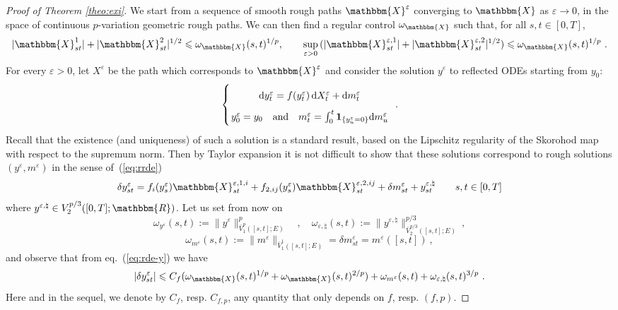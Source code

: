\documentclass[11pt,reqno,oneside]{amsart}
\numberwithin{equation}{section}
\newcommand{\mathd}{\mathrm{d}}
\newcommand{\ep}{\varepsilon}
\begin{document}
\begin{proof}[Proof of Theorem \ref{theo:exi}]
We start from a sequence of smooth rough paths $\mathbbm{X}^{\varepsilon}$
converging to $\mathbbm{X}$ as $\varepsilon \to 0$, in the space of continuous $p$-variation geometric rough
paths. We can then find a regular control $\omega_{\mathbbm{X}}$ such that, for all $s,t\in [0,T]$,
\[ | \mathbbm{X}^1_{s t} | + | \mathbbm{X}^2_{s t} |^{1 / 2} \leqslant
   \omega_{\mathbbm{X}} (s, t)^{1 / p}, \qquad \sup_{\varepsilon >0}\, (|
   \mathbbm{X}^{\varepsilon, 1}_{s t} | + | \mathbbm{X}^{\varepsilon, 2}_{s t}
   |^{1 / 2}) \leqslant \omega_{\mathbbm{X}} (s, t)^{1 / p}\  . \]
For every $\varepsilon >0$, let $X^{\varepsilon}$ be the path which corresponds to
  $\mathbbm{X}^{\varepsilon}$ and consider the solution $y^{\varepsilon}$ to
  reflected ODEs starting from $y_0$:
$$
\left\lbrace
\arraycolsep=1pt\def\arraystretch{1.8}
  \begin{array}{c}
   \mathd y^\varepsilon_t= f (y^{\varepsilon}_t)\, \mathd X^{\varepsilon}_{t}+ \mathd m^{\varepsilon}_{t} \\
    y^{\varepsilon}_0=y_0 \quad \text{and} \quad m^{\varepsilon}_t=\int_0^t \mathbf{1}_{\{ y^{\varepsilon}_u=0\}}  \mathd m^{\varepsilon}_u 
  \end{array} 
	\right. \ .
	$$
{Recall that the existence (and uniqueness) of such a solution is a standard result, based on the Lipschitz regularity of the Skorohod map with respect to the supremum norm.} Then by Taylor expansion it is not difficult to show
  that these solutions correspond to rough solutions $(y^{\varepsilon},
  m^{\varepsilon})$ in the sense of~(\ref{eq:rrde})
  \begin{equation}
    \delta y^{\varepsilon}_{s t} = f_i(y^{\varepsilon}_s)
    \mathbbm{X}^{\varepsilon, 1,i}_{s t} + f_{2,ij} (y^{\varepsilon}_s)
    \mathbbm{X}^{\varepsilon, 2,ij}_{s t} + \delta m_{s t}^{\varepsilon} +
    y^{\varepsilon, \natural}_{s t} \qquad s, t \in [0, T] \label{eq:rde-y}
  \end{equation}
  where $y^{\varepsilon, \natural} \in V_{2}^{p / 3}([0,T];\mathbbm{R})$. Let us set from now on
	$$\omega_{y^\ep}(s,t):=\| y^\ep \|_{\bar{V}^p_1 ([s, t] ; E)}^p \quad , \quad \omega_{\ep,\natural}(s,t):=\| y^{\ep,\natural} \|_{\bar{V}^{p/3}_2 ([s, t] ; E)}^{p/3} \ ,$$
		$$\omega_{m^\ep}(s,t):=\| m^\ep \|_{\bar{V}^{1}_1 ([s, t] ; E)}=\delta m^\ep_{st}=m^\ep([s,t]) \ ,$$
and observe that from eq.~(\ref{eq:rde-y}) we have
	  \begin{equation}
    | \delta y^{\varepsilon}_{s t} | \leqslant C_f (\omega_{\mathbbm{X}} (s,
    t)^{1 / p} + \omega_{\mathbbm{X}} (s, t)^{2 / p}) +
    \omega_{m^{\varepsilon}} (s, t) + \omega_{\varepsilon, \natural} (s, t)^{3
    / p}\ . \label{eq:y-bound}
  \end{equation}
	Here and in the sequel, we denote by $C_f$, resp. $C_{f,p}$, any quantity that only depends on $f$, resp. $(f,p)$. 
  

\end{proof}
\end{document}
